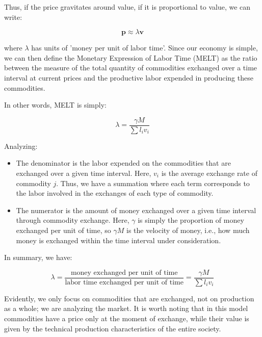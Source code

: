 Thus, if the price gravitates around value, if it is proportional to value, we can write:

\begin{equation}
\boldsymbol{p} \approx \lambda \boldsymbol{v}
\end{equation}

where $\lambda$ has units of 'money per unit of labor time'. Since our economy is simple, we can then define the Monetary Expression of Labor Time (MELT)  as the ratio between the measure of the total quantity of commodities exchanged over a time interval at current prices  and the productive labor expended in producing these commodities.  

In other words, MELT is simply:



\begin{equation}
\lambda = \frac{\gamma M}{\sum l_{i}v_{i}}
\end{equation}



Analyzing:  
\begin{itemize}
    \item The denominator is the labor expended on the commodities that are exchanged over a given time interval.    Here, $v_{i}$ is the average exchange rate of commodity $j$.  Thus, we have a summation where each term corresponds to the labor involved in the exchanges of each type of commodity.  

\item The numerator is the amount of money exchanged over a given time interval through commodity exchange.    Here, $\gamma$ is simply the proportion of money exchanged per unit of time, so $\gamma M$ is the velocity of money,    i.e., how much money is exchanged within the time interval under consideration.  

\end{itemize}

In summary, we have:

\begin{equation}
\lambda = \frac{\text{money exchanged per unit of time}}{\text{labor time exchanged per unit of time}} = \frac{\gamma M}{\sum l_{i}v_{i}}
\end{equation}

Evidently, we only focus on commodities that are exchanged, not on production as a whole; we are analyzing the market. It is worth noting that in this model commodities have a price only at the moment of exchange,  while their value is given by the technical production characteristics of the entire society.

